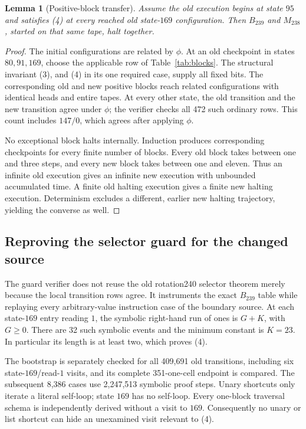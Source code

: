 \documentclass[11pt]{article}
\newtheorem{lemma}[theorem]{Lemma}
\theoremstyle{definition}\newtheorem{definition}[theorem]{Definition}
\begin{document}
\begin{lemma}[Positive-block transfer]
Assume the old execution begins at state $95$ and satisfies (4) at every
reached old state-$169$ configuration.  Then $B_{239}$ and $M_{238}$,
started on that same tape, halt together.
\end{lemma}

\begin{proof}
The initial configurations are related by $\phi$.  At an old checkpoint in
states $80,91,169$, choose the applicable row of Table~\ref{tab:blocks}.
The structural invariant (3), and (4) in its one required case, supply all
fixed bits.  The corresponding old and new positive blocks reach related
configurations with identical heads and entire tapes.  At every other
state, the old transition and the new transition agree under $\phi$;
the verifier checks all 472 such ordinary rows.  This count includes
$147/0$, which agrees after applying $\phi$.

No exceptional block halts internally.  Induction produces corresponding
checkpoints for every finite number of blocks.  Every old block takes
between one and three steps, and every new block takes between one and
eleven.  Thus an infinite old execution gives an infinite new execution
with unbounded accumulated time.  A finite old halting execution gives a
finite new halting execution.  Determinism excludes a different, earlier
new halting trajectory, yielding the converse as well.
\end{proof}

\subsection{Reproving the selector guard for the changed source}
\label{sec:guard}

The guard verifier does not reuse the old rotation240 selector theorem
merely because the local transition rows agree.  It instruments the exact
$B_{239}$ table while replaying every arbitrary-value instruction case of
the boundary source.  At each state-$169$ entry reading $1$, the symbolic
right-hand run of ones is $G+K$, with $G\ge0$.  There are 32 such symbolic
events and the minimum constant is $K=23$.  In particular its length is
at least two, which proves (4).

The bootstrap is separately checked for all 409,691 old transitions,
including six state-$169$/read-$1$ visits, and its complete 351-one-cell
endpoint is compared.  The subsequent 8,386 cases use 2,247,513 symbolic
proof steps.  Unary shortcuts only iterate a literal self-loop; state
$169$ has no self-loop.  Every one-block traversal schema is independently
derived without a visit to $169$.  Consequently no unary or list shortcut
can hide an unexamined visit relevant to (4).
\end{document}

